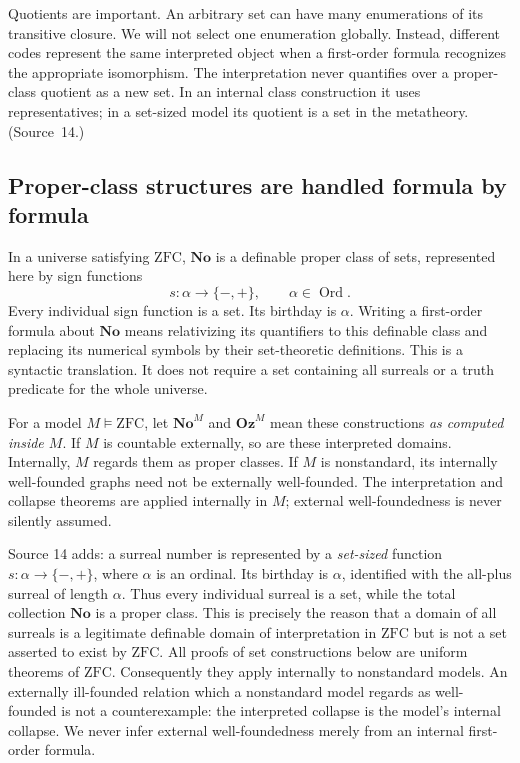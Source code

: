 \documentclass[11pt,letterpaper]{article}
\theoremstyle{definition}
\theoremstyle{remark}
\newcommand{\No}{\mathbf{No}}
\newcommand{\Ord}{\operatorname{Ord}}
\newcommand{\ZFC}{\mathrm{ZFC}}
\newcommand{\Oz}{\mathbf{Oz}}
\begin{document}
Quotients are important. An arbitrary set can have many enumerations of its
transitive closure. We will not select one enumeration globally. Instead,
different codes represent the same interpreted object when a first-order formula
recognizes the appropriate isomorphism. The interpretation never quantifies over a
proper-class quotient as a new set. In an internal class construction it uses
representatives; in a set-sized model its quotient is a set in the metatheory.
(Source~14.)

\subsection{Proper-class structures are handled formula by formula}

In a universe satisfying $\ZFC$, $\No$ is a definable proper class of sets,
represented here by sign functions
\[
 s:\alpha\longrightarrow\{-,+\},\qquad \alpha\in\Ord.
\]
Every individual sign function is a set. Its birthday is $\alpha$. Writing a
first-order formula about $\No$ means relativizing its quantifiers to this
definable class and replacing its numerical symbols by their set-theoretic
definitions. This is a syntactic translation. It does not require a set
containing all surreals or a truth predicate for the whole universe.

For a model $M\models\ZFC$, let $\No^M$ and $\Oz^M$ mean these constructions
\emph{as computed inside $M$}. If $M$ is countable externally, so are these
interpreted domains. Internally, $M$ regards them as proper classes. If $M$ is
nonstandard, its internally well-founded graphs need not be externally
well-founded. The interpretation and collapse theorems are applied internally in
$M$; external well-foundedness is never silently assumed.

Source 14 adds: a surreal number is represented by a \emph{set-sized} function
$s:\alpha\to\{-,+\}$, where $\alpha$ is an ordinal. Its birthday is $\alpha$,
identified with the all-plus surreal of length $\alpha$. Thus every individual
surreal is a set, while the total collection $\No$ is a proper class. This is
precisely the reason that a domain of all surreals is a legitimate definable
domain of interpretation in $\ZFC$ but is not a set asserted to exist by $\ZFC$.
All proofs of set constructions below are uniform theorems of $\ZFC$.
Consequently they apply internally to nonstandard models. An externally
ill-founded relation which a nonstandard model regards as well-founded is not a
counterexample: the interpreted collapse is the model's internal collapse. We
never infer external well-foundedness merely from an internal first-order
formula.
\end{document}
